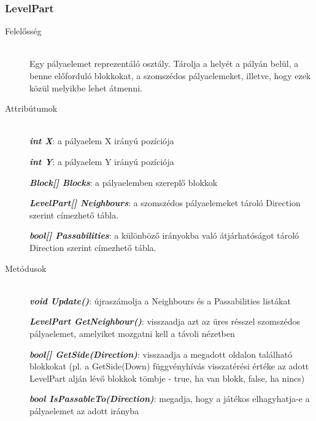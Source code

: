 \subsubsection{LevelPart}
	\begin{description}
		\item[Felelősség] \hfill \\
		Egy pályaelemet reprezentáló osztály. Tárolja a helyét a pályán belül, a benne előforduló blokkokat, a szomszédos pályaelemeket, illetve, hogy ezek közül melyikbe lehet átmenni.

		\item[Attribútumok]\hfill \\		
		\textbf{\emph{int X}}: a pályaelem X irányú pozíciója
		
		\textbf{\emph{int Y}}: a pályaelem Y irányú pozíciója
		
		\textbf{\emph{Block[] Blocks}}: a pályaelemben szereplő blokkok
		
		\textbf{\emph{LevelPart[] Neighbours}}: a szomszédos pályaelemeket tároló Direction szerint címezhető tábla.
		
		\textbf{\emph{bool[] Passabilities}}: a különböző irányokba való átjárhatóságot tároló Direction szerint címezhető tábla.
		
		\item[Metódusok]\hfill \\
		\textbf{\emph{void Update()}}: újraszámolja a Neighbours és a Passabilities listákat
	
		\textbf{\emph{LevelPart GetNeighbour()}}: visszaadja azt az üres résszel szomszédos pályaelemet, amelyiket mozgatni kell a távoli nézetben

		\textbf{\emph{bool[] GetSide(Direction)}}: visszaadja a megadott oldalon található blokkokat (pl. a GetSide(Down) függvényhívás visszatérési értéke az adott LevelPart alján lévő blokkok tömbje - true, ha van blokk, false, ha nincs)
		
		\textbf{\emph{bool IsPassableTo(Direction)}}: megadja, hogy a játékos elhagyhatja-e a pályaelemet az adott irányba
	\end{description}
	
